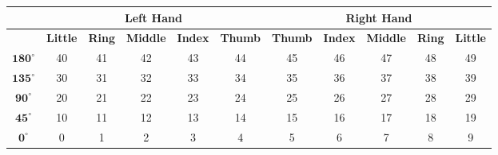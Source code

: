 \documentclass[border=2mm]{standalone}
\begin{document}
    \begin{tabular}{|c|c|c|c|c|c|c|c|c|c|c|}
        \hline
        & \multicolumn{5}{|c|}{\textbf{Left Hand}} & \multicolumn{5}{c|}{\textbf{Right Hand}} \\
        \hline
        & \textbf{Little} & \textbf{Ring} & \textbf{Middle} & \textbf{Index} &
        \textbf{Thumb}& \textbf{Thumb} & \textbf{Index} & \textbf{Middle} &
        \textbf{Ring} & \textbf{Little} \\
        \hline
        $\bm{180^\circ}$ & 40 & 41 & 42 & 43 & 44 & 45 & 46 & 47 & 48 & 49 \\
        \hline
        $\bm{135^\circ}$ & 30 & 31 & 32 & 33 & 34 & 35 & 36 & 37 & 38 & 39 \\
        \hline
        $\bm{90^\circ}$  & 20 & 21 & 22 & 23 & 24 & 25 & 26 & 27 & 28 & 29 \\
        \hline
        $\bm{45^\circ}$  & 10 & 11 & 12 & 13 & 14 & 15 & 16 & 17 & 18 & 19 \\
        \hline
        $\bm{0^\circ}$   &  0 &  1 &  2 &  3 &  4 &  5 &  6 &  7 &  8 &  9 \\
        \hline
    \end{tabular}
\end{document}
